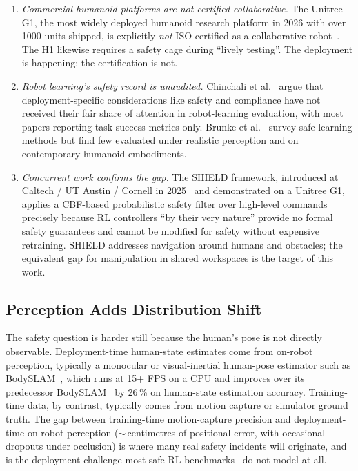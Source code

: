 \documentclass[11pt,a4paper]{report}
\newcommand{\bodyslampp}{BodySLAM\nolinebreak[4]\hspace{-.05em}\raisebox{.2ex}{\scriptsize ++}}
\begin{document}
\begin{enumerate}[topsep=2pt,itemsep=2pt]
\item \emph{Commercial humanoid platforms are not certified
  collaborative.} The Unitree G1, the most widely deployed humanoid
  research platform in 2026 with over 1000 units shipped, is
  explicitly \emph{not} ISO-certified as a collaborative
  robot~\cite{unitree_g1}. The H1 likewise requires a safety cage
  during ``lively testing''. The deployment is happening; the
  certification is not.
\item \emph{Robot learning's safety record is unaudited.}
  Chinchali et al.~\cite{auditing2021} argue that deployment-specific
  considerations like safety and compliance have not received their
  fair share of attention in robot-learning evaluation, with most
  papers reporting task-success metrics only. Brunke et
  al.~\cite{brunke2022safelearning} survey safe-learning methods but
  find few evaluated under realistic perception and on contemporary
  humanoid embodiments.
\item \emph{Concurrent work confirms the gap.} The SHIELD framework,
  introduced at Caltech / UT Austin / Cornell in
  2025~\cite{shield2025} and demonstrated on a Unitree G1, applies a
  CBF-based probabilistic safety filter over high-level commands
  precisely because RL controllers ``by their very nature'' provide
  no formal safety guarantees and cannot be modified for safety
  without expensive retraining. SHIELD addresses navigation around
  humans and obstacles; the equivalent gap for manipulation in
  shared workspaces is the target of this work.
\end{enumerate}

\subsection{Perception Adds Distribution Shift}
\label{sec:intro:mot:perception}

The safety question is harder still because the human's pose is not
directly observable. Deployment-time human-state estimates come from
on-robot perception, typically a monocular or visual-inertial
human-pose estimator such as \bodyslampp{}~\cite{henning2023bodyslampp},
which runs at 15+ FPS on a CPU and improves over its predecessor
BodySLAM~\cite{henning2022bodyslam} by 26\,\% on human-state
estimation accuracy. Training-time data, by contrast, typically
comes from motion capture or simulator ground truth.
The gap between training-time motion-capture precision and
deployment-time on-robot perception ($\sim$\,centimetres of
positional error, with occasional dropouts under occlusion) is where
many real safety incidents will originate, and is the deployment
challenge most safe-RL benchmarks~\cite{ray2019safetygym,
ji2023safetygymnasium,yuan2022safecontrolgym} do not model at all.
\end{document}
